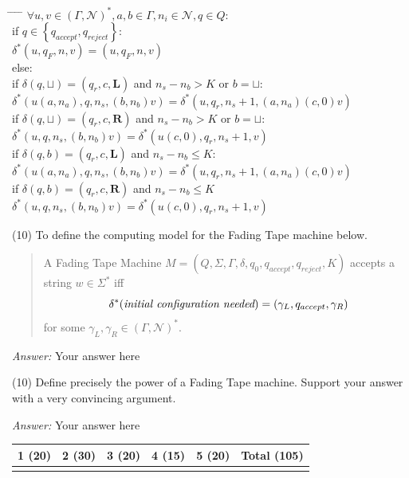 \documentclass[11pt]{article}
\newenvironment{smallquote}{\vspace*{-2ex}\begin{list}{}{%
  \setlength\rightmargin{1.5em}\setlength\leftmargin{1.5em}\setlength\labelwidth{0pt}\setlength\itemindent{0pt}}\item[]}{\end{list}\vspace*{-1.3ex}}
\newcommand{\answer}[1]{\par \bigskip \begin{smallquote}\emph{Answer:} #1\end{smallquote}}
\begin{document}
\begin{tabbing}
\hspace*{0.1in} \= \hspace*{0.1in} \= \hspace*{0.1in} \= \hspace*{0.1in} \= \kill 
$\forall u, v \in (\Gamma, \mathcal{N})^{*}, a, b \in \Gamma, n_i \in \mathcal{N}, q \in Q$:\\
\> if $q \in \left\{q_{accept}, q_{reject}\right\}$: \\
\> \> \> $\delta^{*}(u, q_{F}, n, v) = (u, q_{F}, n, v)$\\
\> else:\\
\> \> if $\delta(q, \sqcup) = (q_r, c, \textbf{L})$ and $n_s - n_b > K$ or $b = \sqcup$:\\
\> \> \> \> $\delta^{*}(u(a, n_a), q, n_s, (b, n_b)v) = \delta^{*}(u, q_r, n_s + 1, (a, n_a)(c, 0)v)$ \\
\> \> if $\delta(q, \sqcup) = (q_r, c, \textbf{R})$ and $n_s - n_b > K$ or $b = \sqcup$:\\
\> \> \> \> $\delta^{*}(u, q, n_s, (b, n_b)v) = \delta^{*}(u(c, 0), q_r, n_s + 1, v)$ \\
\> \> if $\delta(q, b) = (q_r, c, \textbf{L})$ and $n_s - n_b \le K$:\\
\> \> \> \> $\delta^{*}(u(a, n_a), q, n_s, (b, n_b)v) = \delta^{*}(u, q_r, n_s + 1, (a, n_a)(c, 0)v)$ \\
\> \> if $\delta(q, b) = (q_r, c, \textbf{R})$ and $n_s - n_b \le K$\\
\> \> \> \> $\delta^{*}(u, q, n_s, (b, n_b)v) = \delta^{*}(u(c, 0), q_r, n_s + 1, v)$\\
\end{tabbing}

\begin{enumerate}
\item (10) To define the computing model for the Fading Tape machine below.
\begin{quote}
A Fading Tape Machine $M = (Q, \Sigma, \Gamma, \delta, q_0, q_{accept}, q_{reject}, K)$ 
accepts a string $w \in \Sigma^{*}$ iff 
\[
\delta^{*}(\text{{\em initial configuration needed}}) = (\gamma_L, q_{accept}, \gamma_R)
\]
for some $\gamma_L, \gamma_R \in (\Gamma, \mathcal{N})^{*}$.
\end{quote}

\answer{Your answer here}

\item (10) Define precisely the power of a Fading Tape machine.  Support your answer with a very convincing argument.

\answer{Your answer here}

\end{enumerate}


\begin{center}

{\Large
		\begin{tabular}{|c|c|c|c|c|c|} \hline
      1 (20) & 2 (30) & 3 (20) & 4 (15) & 5 (20) & Total (105) \\ \hline
			\qquad\qquad  &\qquad\qquad   &\qquad\qquad   & \qquad\qquad  &\qquad\qquad   & \qquad\qquad  \\ \hline
		\end{tabular}
}
\end{center}
\end{document}

